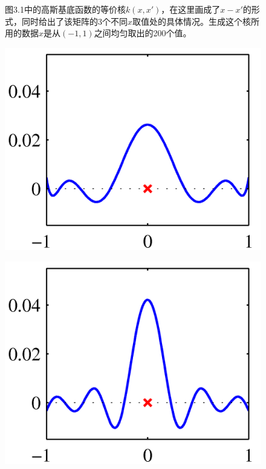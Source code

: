 \documentclass[b5paper]{book}
\numberwithin{equation}{chapter}
\begin{document}
{\begin{figure}[ht]
		\caption{图3.1中的高斯基底函数的等价核$k(x,x')$，在这里画成了$x-x'$的形式，同时给出了该矩阵的3个不同$x$取值处的具体情况。生成这个核所用的数据$x$是从$(-1,1)$之间均匀取出的200个值。}
		\label{fig:3-10}
	\end{figure}
	\begin{figure}[ht]
		\begin{minipage}[t]{0.5\linewidth}
		\centering
		\includegraphics[scale=0.8]{Images/3-11a.png}
		\label{fig:3-11a}
		\end{minipage}
		\begin{minipage}[t]{0.5\linewidth}
		\centering
		\includegraphics[scale=0.8]{Images/3-11b.png}

\end{minipage}
\end{figure}}
\end{document}
